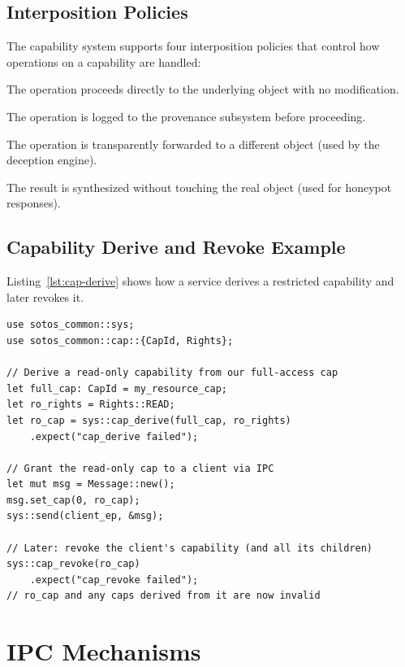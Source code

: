 \documentclass[11pt,a4paper,twoside]{report}
\theoremstyle{definition}
\begin{document}
\section{Interposition Policies}

The capability system supports four interposition policies that control how
operations on a capability are handled:

\begin{description}[leftmargin=1.4em]
  \item[Passthrough.] The operation proceeds directly to the underlying
    object with no modification.
  \item[Inspect.] The operation is logged to the provenance subsystem
    before proceeding.
  \item[Redirect.] The operation is transparently forwarded to a
    different object (used by the deception engine).
  \item[Fabricate.] The result is synthesized without touching the real
    object (used for honeypot responses).
\end{description}

\section{Capability Derive and Revoke Example}

Listing~\ref{lst:cap-derive} shows how a service derives a restricted
capability and later revokes it.

\begin{lstlisting}[caption={Capability derivation and revocation.},
                   label={lst:cap-derive}]
use sotos_common::sys;
use sotos_common::cap::{CapId, Rights};

// Derive a read-only capability from our full-access cap
let full_cap: CapId = my_resource_cap;
let ro_rights = Rights::READ;
let ro_cap = sys::cap_derive(full_cap, ro_rights)
    .expect("cap_derive failed");

// Grant the read-only cap to a client via IPC
let mut msg = Message::new();
msg.set_cap(0, ro_cap);
sys::send(client_ep, &msg);

// Later: revoke the client's capability (and all its children)
sys::cap_revoke(ro_cap)
    .expect("cap_revoke failed");
// ro_cap and any caps derived from it are now invalid
\end{lstlisting}


\chapter{IPC Mechanisms}
\label{ch:ipc}
\end{document}
